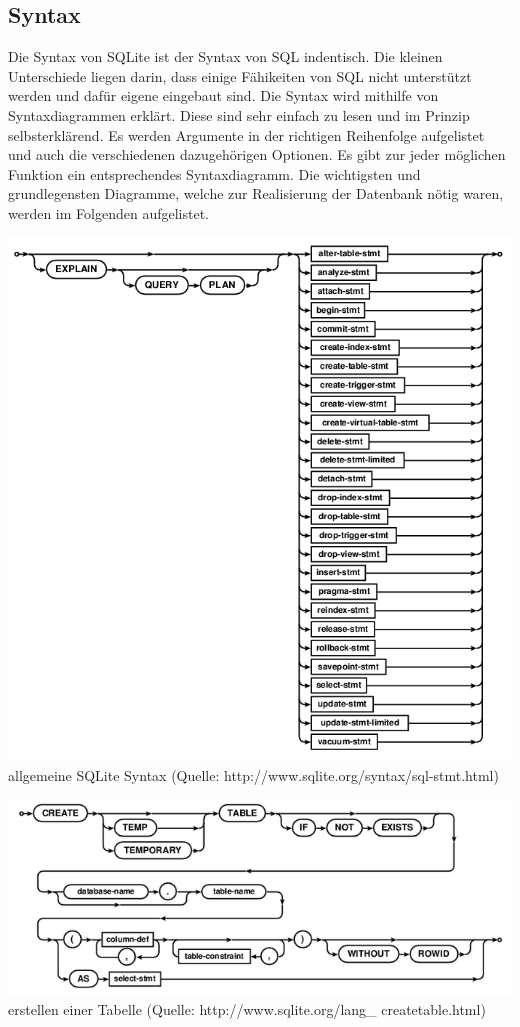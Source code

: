 \documentclass[12pt,a4paper]{report}
\begin{document}
\begin{onehalfspace}
\subsection{Syntax}
Die Syntax von SQLite ist der Syntax von SQL indentisch. Die kleinen Unterschiede liegen darin, dass einige Fähikeiten von SQL nicht unterstützt werden und dafür eigene eingebaut sind. Die Syntax wird mithilfe von Syntaxdiagrammen erklärt.
Diese sind sehr einfach zu lesen und im Prinzip selbsterklärend. Es werden Argumente in der richtigen Reihenfolge aufgelistet und auch die verschiedenen dazugehörigen Optionen. Es gibt zur jeder möglichen Funktion ein entsprechendes Syntaxdiagramm. Die wichtigsten und grundlegensten Diagramme, welche zur Realisierung der Datenbank nötig waren, werden im Folgenden aufgelistet.

\begin{center}
\includegraphics[scale=0.8]{img/sqlite_syntax.png}\\
allgemeine SQLite Syntax (Quelle: http://www.sqlite.org/syntax/sql-stmt.html)
\end{center}

\begin{center}
\includegraphics[scale=0.8]{img/sqlite_create.png}\\
erstellen einer Tabelle (Quelle: http://www.sqlite.org/lang\_ createtable.html)
\end{center}


\end{onehalfspace}
\end{document}
